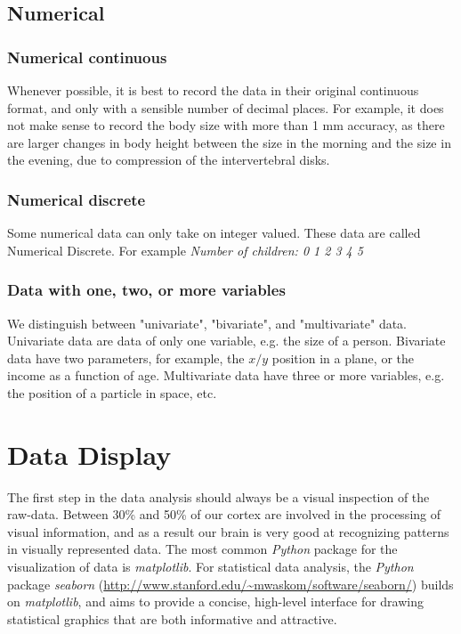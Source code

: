 \subsection{Numerical}

\subsubsection{Numerical continuous}
Whenever possible, it is best to record the data in their original continuous format, and only with a sensible number of decimal places. For example, it does not make sense to record the body size with more than 1 mm accuracy, as there are larger changes in body height between the size in the morning and the size in the evening, due to compression of the intervertebral disks.

\subsubsection{Numerical discrete}
Some numerical data can only take on integer valued. These data are called Numerical Discrete. For example \emph{Number of children: 0 1 2 3 4 5}

\subsubsection{Data with one, two, or more variables}

We distinguish between "univariate", "bivariate", and "multivariate" data. Univariate data  are data of only one variable, e.g. the size of a person. Bivariate data  have two parameters, for example, the $x/y$ position in a plane, or the income as a function of age. Multivariate data  have three or more variables, e.g. the position of a particle in space, etc.

\section{Data Display}

The first step in the data analysis should always be a visual inspection of the raw-data. Between 30\% and 50\% of our cortex are involved in the processing of visual information, and as a result our brain is very good at recognizing patterns in visually represented data.
The most common \emph{Python} package for the visualization of data is \emph{matplotlib}. For statistical data analysis, the \emph{Python} package \emph{seaborn} (\url{http://www.stanford.edu/~mwaskom/software/seaborn/}) builds on \emph{matplotlib}, and aims to provide a concise, high-level interface for drawing statistical graphics that are both informative and attractive.

